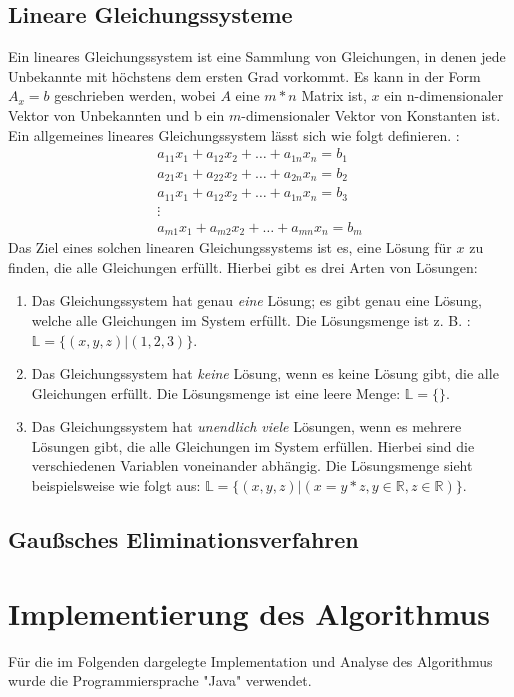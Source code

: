 \documentclass[a4paper, 12pt]{report}
\begin{document}
\begin{sloppypar}
\section{Lineare Gleichungssysteme}
Ein lineares Gleichungssystem ist eine Sammlung von Gleichungen, in denen jede Unbekannte mit höchstens dem ersten Grad vorkommt.
Es kann in der Form $ A_x = b $ geschrieben werden, wobei $A$ eine $ m * n $ Matrix ist, $x$ ein n-dimensionaler Vektor von Unbekannten
und b ein $m$-dimensionaler Vektor von Konstanten ist.
Ein allgemeines lineares Gleichungssystem lässt sich wie folgt definieren. :
\begin{align*}
    a_{11}x_{1}+ a_{12}x_{2}+\hdots+ a_{1n}x_{n} = b_1 \\
    a_{21}x_{1}+ a_{22}x_{2}+\hdots+ a_{2n}x_{n} = b_2\\
    a_{11}x_{1}+ a_{12}x_{2}+\hdots+ a_{1n}x_{n} = b_3 \\
    \vdots \\
a_{m1}x_{1}+ a_{m2}x_2+\hdots+a_{mn}x_{n} = b_{m}
\end{align*}
\newpage
Das Ziel eines solchen linearen Gleichungssystems ist es, eine Lösung für $x$ zu finden, die alle Gleichungen erfüllt.
Hierbei gibt es drei Arten von Lösungen:
\begin{enumerate}
    \item Das Gleichungssystem hat genau \textit{eine} Lösung; es gibt genau eine Lösung, welche alle Gleichungen im System erfüllt. Die Lösungsmenge ist z. B. : $\mathbb{L} = \{ (x,y,z)| (1,2,3)\} $.
    \item Das Gleichungssystem hat \textit{keine} Lösung, wenn es keine Lösung gibt, die alle Gleichungen erfüllt. Die Lösungsmenge ist eine leere Menge: $\mathbb{L} = \{ \}$.
    \item Das Gleichungssystem hat \textit{unendlich viele} Lösungen, wenn es mehrere Lösungen gibt, die alle Gleichungen im System erfüllen.
        Hierbei sind die verschiedenen Variablen voneinander abhängig. Die Lösungsmenge sieht beispielsweise wie folgt aus: \newline $ \mathbb{L} = \{(x, y, z)| (x = y * z, y\in \mathbb{R}, z \in \mathbb{R}) \} $.
\end{enumerate}


\section{Gaußsches Eliminationsverfahren}
\chapter{Implementierung des Algorithmus}
Für die im Folgenden dargelegte Implementation und Analyse des Algorithmus wurde die Programmiersprache "Java" verwendet.

\end{sloppypar}
\end{document}
